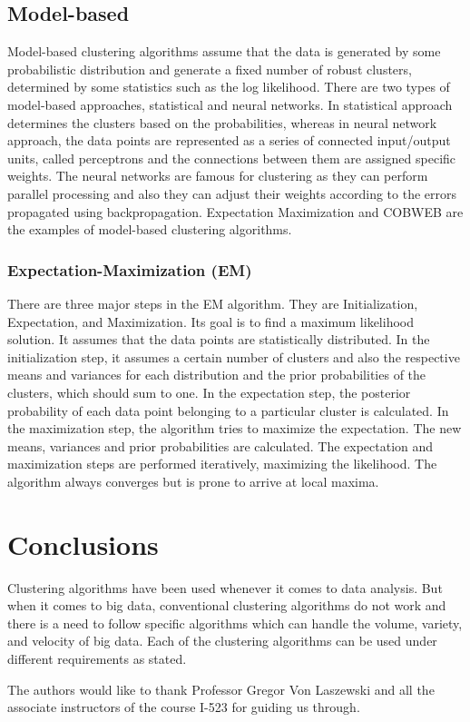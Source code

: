 \documentclass[sigconf]{acmart}
\begin{document}
\subsection{Model-based}
Model-based clustering algorithms assume that the data is generated by some probabilistic distribution and generate a fixed number of robust clusters, determined by some statistics such as the log likelihood. There are two types of model-based approaches, statistical and neural networks. In statistical approach determines the clusters based on the probabilities, whereas in neural network approach, the data points are represented as a series of connected input/output units, called perceptrons and the connections between them are assigned specific weights. The neural networks are famous for clustering as they can perform parallel processing and also they can adjust their weights according to the errors propagated using backpropagation. Expectation Maximization and COBWEB are the examples of model-based clustering algorithms.
\subsubsection{Expectation-Maximization (EM)}
There are three major steps in the EM algorithm. They are Initialization, Expectation, and Maximization. Its goal is to find a maximum likelihood solution.\cite{Dempster1977} It assumes that the data points are statistically distributed. In the initialization step, it assumes a certain number of clusters and also the respective means and variances for each distribution and the prior probabilities of the clusters, which should sum to one. In the expectation step, the posterior probability of each data point belonging to a particular cluster is calculated. In the maximization step, the algorithm tries to maximize the expectation. The new means, variances and prior probabilities are calculated. The expectation and maximization steps are performed iteratively, maximizing the likelihood. The algorithm always converges but is prone to arrive at local maxima. 



\section{Conclusions}
Clustering algorithms have been used whenever it comes to data analysis. But when it comes to big data, conventional clustering algorithms do not work and there is a need to follow specific algorithms which can handle the volume, variety, and velocity of big data. Each of the clustering algorithms can be used under different requirements as stated. 
\begin{acks}

  The authors would like to thank Professor Gregor Von Laszewski and all the associate instructors of the course I-523 for guiding us through.
\end{acks}




\end{document}
